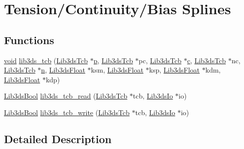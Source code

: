 \hypertarget{group__tcb}{\section{Tension/\-Continuity/\-Bias Splines}
\label{group__tcb}
}
\subsection*{Functions}
\begin{DoxyCompactItemize}
\item 
\hyperlink{group___u_a_v_objects_plugin_ga444cf2ff3f0ecbe028adce838d373f5c}{void} \hyperlink{group__tcb_ga52e1b19dc5ef45021221d19f48a721c4}{lib3ds\-\_\-tcb} (\hyperlink{struct_lib3ds_tcb}{Lib3ds\-Tcb} $\ast$\hyperlink{glext_8h_aa5367c14d90f462230c2611b81b41d23}{p}, \hyperlink{struct_lib3ds_tcb}{Lib3ds\-Tcb} $\ast$pc, \hyperlink{struct_lib3ds_tcb}{Lib3ds\-Tcb} $\ast$\hyperlink{glext_8h_a1f2d7f8147412c43ba2303a56f97ee73}{c}, \hyperlink{struct_lib3ds_tcb}{Lib3ds\-Tcb} $\ast$nc, \hyperlink{struct_lib3ds_tcb}{Lib3ds\-Tcb} $\ast$\hyperlink{glext_8h_a4eacae1d9e7c39f8236bb36d4ececa77}{n}, \hyperlink{types_8h_ab18e70f51f9a53c9dee8d930c8e1a7bf}{Lib3ds\-Float} $\ast$ksm, \hyperlink{types_8h_ab18e70f51f9a53c9dee8d930c8e1a7bf}{Lib3ds\-Float} $\ast$ksp, \hyperlink{types_8h_ab18e70f51f9a53c9dee8d930c8e1a7bf}{Lib3ds\-Float} $\ast$kdm, \hyperlink{types_8h_ab18e70f51f9a53c9dee8d930c8e1a7bf}{Lib3ds\-Float} $\ast$kdp)
\item 
\hyperlink{types_8h_a89dd7398a9ebbbf28011f8c32df67ad3}{Lib3ds\-Bool} \hyperlink{group__tcb_gab1b7b22e71a7f85e2b772372b68dbdf4}{lib3ds\-\_\-tcb\-\_\-read} (\hyperlink{struct_lib3ds_tcb}{Lib3ds\-Tcb} $\ast$tcb, \hyperlink{struct_lib3ds_io}{Lib3ds\-Io} $\ast$io)
\item 
\hyperlink{types_8h_a89dd7398a9ebbbf28011f8c32df67ad3}{Lib3ds\-Bool} \hyperlink{group__tcb_ga3902c09539835ac1f0eb49beb5ac7706}{lib3ds\-\_\-tcb\-\_\-write} (\hyperlink{struct_lib3ds_tcb}{Lib3ds\-Tcb} $\ast$tcb, \hyperlink{struct_lib3ds_io}{Lib3ds\-Io} $\ast$io)
\end{DoxyCompactItemize}


\subsection{Detailed Description}


